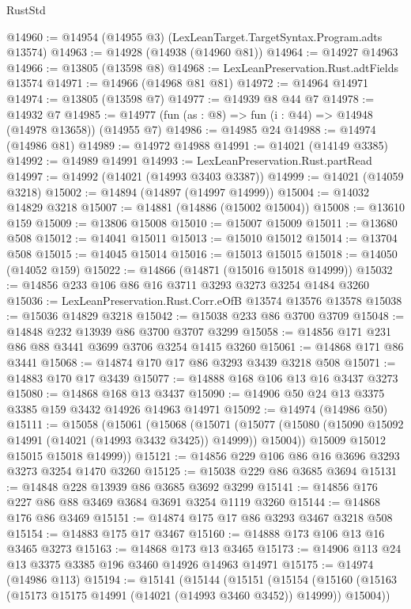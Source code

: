 \begin{lexlean}{RustStd}
\begin{coremodule}
{\begin{coremodule}
{{{{{{{{{{{{{{{{{{{{{{{{{{{{{{{{{{{{{{{@14960 := @14954 (@14955 @3) (LexLeanTarget.TargetSyntax.Program.adts @13574)
@14963 := @14928 (@14938 (@14960 @81))
@14964 := @14927 @14963
@14966 := @13805 (@13598 @8)
@14968 := LexLeanPreservation.Rust.adtFields @13574
@14971 := @14966 (@14968 @81 @81)
@14972 := @14964 @14971
@14974 := @13805 (@13598 @7)
@14977 := @14939 @8 @44 @7
@14978 := @14932 @7
@14985 := @14977 (fun (as : @8) => fun (i : @44) => @14948 (@14978 @13658)) (@14955 @7)
@14986 := @14985 @24
@14988 := @14974 (@14986 @81)
@14989 := @14972 @14988
@14991 := @14021 (@14149 @3385)
@14992 := @14989 @14991
@14993 := LexLeanPreservation.Rust.partRead
@14997 := @14992 (@14021 (@14993 @3403 @3387))
@14999 := @14021 (@14059 @3218)
@15002 := @14894 (@14897 (@14997 @14999))
@15004 := @14032 @14829 @3218
@15007 := @14881 (@14886 (@15002 @15004))
@15008 := @13610 @159
@15009 := @13806 @15008
@15010 := @15007 @15009
@15011 := @13680 @508
@15012 := @14041 @15011
@15013 := @15010 @15012
@15014 := @13704 @508
@15015 := @14045 @15014
@15016 := @15013 @15015
@15018 := @14050 (@14052 @159)
@15022 := @14866 (@14871 (@15016 @15018 @14999))
@15032 := @14856 @233 @106 @86 @16 @3711 @3293 @3273 @3254 @1484 @3260
@15036 := LexLeanPreservation.Rust.Corr.eOfB @13574 @13576 @13578
@15038 := @15036 @14829 @3218
@15042 := @15038 @233 @86 @3700 @3709
@15048 := @14848 @232 @13939 @86 @3700 @3707 @3299
@15058 := @14856 @171 @231 @86 @88 @3441 @3699 @3706 @3254 @1415 @3260
@15061 := @14868 @171 @86 @3441
@15068 := @14874 @170 @17 @86 @3293 @3439 @3218 @508
@15071 := @14883 @170 @17 @3439
@15077 := @14888 @168 @106 @13 @16 @3437 @3273
@15080 := @14868 @168 @13 @3437
@15090 := @14906 @50 @24 @13 @3375 @3385 @159 @3432 @14926 @14963 @14971
@15092 := @14974 (@14986 @50)
@15111 := @15058
    (@15061
      (@15068
        (@15071
          (@15077 (@15080 (@15090 @15092 @14991 (@14021 (@14993 @3432 @3425)) @14999)) @15004))
        @15009
        @15012
        @15015
        @15018
        @14999))
@15121 := @14856 @229 @106 @86 @16 @3696 @3293 @3273 @3254 @1470 @3260
@15125 := @15038 @229 @86 @3685 @3694
@15131 := @14848 @228 @13939 @86 @3685 @3692 @3299
@15141 := @14856 @176 @227 @86 @88 @3469 @3684 @3691 @3254 @1119 @3260
@15144 := @14868 @176 @86 @3469
@15151 := @14874 @175 @17 @86 @3293 @3467 @3218 @508
@15154 := @14883 @175 @17 @3467
@15160 := @14888 @173 @106 @13 @16 @3465 @3273
@15163 := @14868 @173 @13 @3465
@15173 := @14906 @113 @24 @13 @3375 @3385 @196 @3460 @14926 @14963 @14971
@15175 := @14974 (@14986 @113)
@15194 := @15141
    (@15144
      (@15151
        (@15154
          (@15160 (@15163 (@15173 @15175 @14991 (@14021 (@14993 @3460 @3452)) @14999)) @15004))
}}}}}}}}}}}}}}}}}}}}}}}}}}}}}}}}}}}}}}}
\end{coremodule}}
\end{coremodule}
\end{lexlean}
